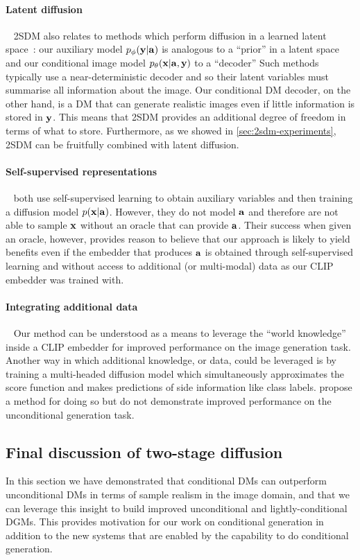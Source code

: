 \paragraph{Latent diffusion}~
2SDM also relates to methods which perform diffusion in a learned latent space~\citep{rombach2022high}: our auxiliary model $p_\phi({\mathbf{y}}|{\mathbf{a}})$ is analogous to a ``prior'' in a latent space and our conditional image model $p_\theta({\mathbf{x}}|{\mathbf{a}},{\mathbf{y}})$ to a ``decoder'' Such methods typically use a near-deterministic decoder and so their latent variables must summarise all information about the image. Our conditional DM decoder, on the other hand, is a DM that can generate realistic images even if little information is stored in ${\mathbf{y}}$. This means that 2SDM provides an additional degree of freedom in terms of what to store. Furthermore, as we showed in \cref{sec:2sdm-experiments}, 2SDM can be fruitfully combined with latent diffusion.

\paragraph{Self-supervised representations}~
\citet{bao2022conditional,hu2022self} both use self-supervised learning to obtain auxiliary variables and then training a diffusion model $p({\mathbf{x}}|{\mathbf{a}})$. However, they do not model ${\mathbf{a}}$ and therefore are not able to sample ${\mathbf{x}}$ without an oracle that can provide ${\mathbf{a}}$. Their success when given an oracle, however, provides reason to believe that our approach is likely to yield benefits even if the embedder that produces ${\mathbf{a}}$ is obtained through self-supervised learning and without access to additional (or multi-modal) data as our CLIP embedder was trained with.

\paragraph{Integrating additional data}~
Our method can be understood as a means to leverage the ``world knowledge'' inside a CLIP embedder for improved performance on the image generation task. Another way in which additional knowledge, or data, could be leveraged is by training a multi-headed diffusion model which simultaneously approximates the score function and makes predictions of side information like class labels. \citet{deja2023learning} propose a method for doing so but do not demonstrate improved performance on the unconditional generation task.

\subsection{Final discussion of two-stage diffusion}
In this section we have demonstrated that conditional DMs can outperform unconditional DMs in terms of sample realism in the image domain, and that we can leverage this insight to build improved unconditional and lightly-conditional DGMs. This provides motivation for our work on conditional generation in addition to the new systems that are enabled by the capability to do conditional generation. 

